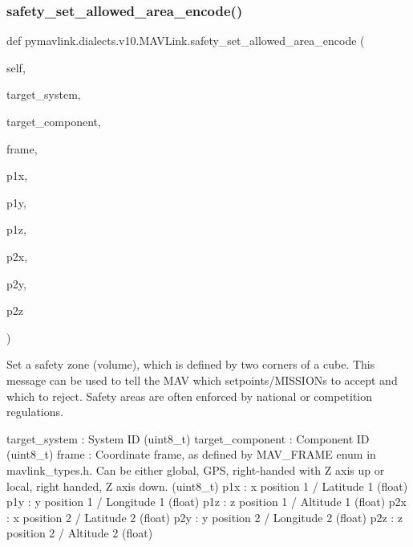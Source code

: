 \begin{DoxyVerb}
\begin{DoxyVerb}
\begin{DoxyVerb}
\begin{DoxyVerb}
\begin{DoxyVerb}
\begin{DoxyVerb}
\begin{DoxyVerb}
\begin{DoxyVerb}
\begin{DoxyVerb}
\begin{DoxyVerb}
\subsubsection{\texorpdfstring{safety\+\_\+set\+\_\+allowed\+\_\+area\+\_\+encode()}{safety\_set\_allowed\_area\_encode()}}
{\footnotesize\ttfamily def pymavlink.\+dialects.\+v10.\+M\+A\+V\+Link.\+safety\+\_\+set\+\_\+allowed\+\_\+area\+\_\+encode (\begin{DoxyParamCaption}\item[{}]{self,  }\item[{}]{target\+\_\+system,  }\item[{}]{target\+\_\+component,  }\item[{}]{frame,  }\item[{}]{p1x,  }\item[{}]{p1y,  }\item[{}]{p1z,  }\item[{}]{p2x,  }\item[{}]{p2y,  }\item[{}]{p2z }\end{DoxyParamCaption})}

\begin{DoxyVerb}Set a safety zone (volume), which is defined by two corners of a cube.
This message can be used to tell the MAV which
setpoints/MISSIONs to accept and which to reject.
Safety areas are often enforced by national or
competition regulations.

target_system             : System ID (uint8_t)
target_component          : Component ID (uint8_t)
frame                     : Coordinate frame, as defined by MAV_FRAME enum in mavlink_types.h. Can be either global, GPS, right-handed with Z axis up or local, right handed, Z axis down. (uint8_t)
p1x                       : x position 1 / Latitude 1 (float)
p1y                       : y position 1 / Longitude 1 (float)
p1z                       : z position 1 / Altitude 1 (float)
p2x                       : x position 2 / Latitude 2 (float)
p2y                       : y position 2 / Longitude 2 (float)
p2z                       : z position 2 / Altitude 2 (float)\end{DoxyVerb}
 \mbox{\label{classpymavlink_1_1dialects_1_1v10_1_1MAVLink_a68c8f968548a0478d793f49f452e4118}} 

\end{DoxyVerb}
\end{DoxyVerb}
\end{DoxyVerb}
\end{DoxyVerb}
\end{DoxyVerb}
\end{DoxyVerb}
\end{DoxyVerb}
\end{DoxyVerb}
\end{DoxyVerb}
\end{DoxyVerb}
